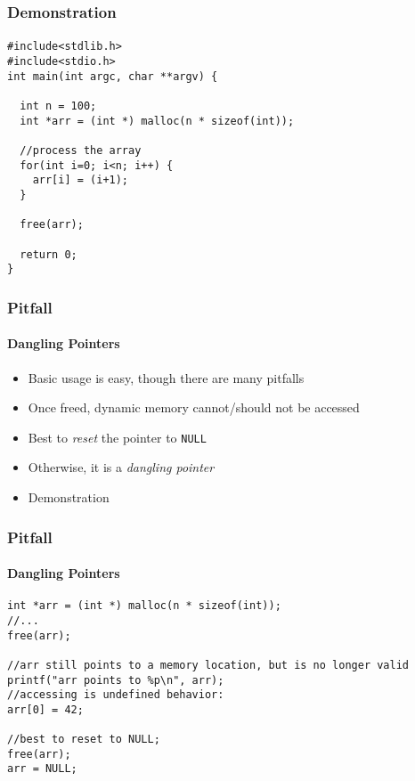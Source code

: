 \documentclass[]{beamer}
\begin{document}
\begin{frame}[fragile]
    \frametitle{Demonstration}
    \framesubtitle{}

\begin{verbatim}
#include<stdlib.h>
#include<stdio.h>
int main(int argc, char **argv) {

  int n = 100;
  int *arr = (int *) malloc(n * sizeof(int));

  //process the array
  for(int i=0; i<n; i++) {
    arr[i] = (i+1);
  }

  free(arr);

  return 0;
}
\end{verbatim}

\end{frame}

\begin{frame}[fragile]
    \frametitle{Pitfall}
    \framesubtitle{Dangling Pointers}

\begin{itemize}[<+->]  
  \item Basic usage is easy, though there are many pitfalls
  \item Once freed, dynamic memory cannot/should not be accessed
  \item Best to \emph{reset} the pointer to \texttt{NULL}
  \item Otherwise, it is a \emph{dangling pointer}
  \item Demonstration
\end{itemize}

\end{frame}

\begin{frame}[fragile]
    \frametitle{Pitfall}
    \framesubtitle{Dangling Pointers}

\begin{verbatim}
int *arr = (int *) malloc(n * sizeof(int));
//...
free(arr);

//arr still points to a memory location, but is no longer valid
printf("arr points to %p\n", arr);
//accessing is undefined behavior:
arr[0] = 42;

//best to reset to NULL;
free(arr);
arr = NULL;
\end{verbatim}

\end{frame}
\end{document}
